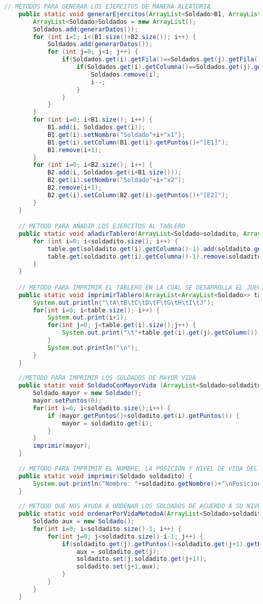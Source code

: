 \documentclass{article}
\begin{document}
\begin{itemize}
\begin{lstlisting}[language=java]
	// METODOS PARA GENERAR LOS EJERCITOS DE MANERA ALEATORIA
	public static void generarEjercitos(ArrayList<Soldado>B1, ArrayList<Soldado>B2) {
		ArrayList<Soldado>Soldados = new ArrayList();
		Soldados.add(generarDatos());
		for (int i=1; i<(B1.size()+B2.size()); i++) {
			Soldados.add(generarDatos());
			for (int j=0; j<i; j++) {
				if(Soldados.get(i).getFila()==Soldados.get(j).getFila()) {
					if(Soldados.get(i).getColumna()==Soldados.get(j).getColumna()){
						Soldados.remove(i);
						i--;
					}
				}
			}
		}
		for (int i=0; i<B1.size(); i++) {
			B1.add(i, Soldados.get(i));
			B1.get(i).setNombre("Soldado"+i+"x1");
			B1.get(i).setColumn(B1.get(i).getPuntos()+"[E1]");
			B1.remove(i+1);
		}
		for (int i=0; i<B2.size(); i++) {
			B2.add(i, Soldados.get(i+B1.size()));
			B2.get(i).setNombre("Soldado"+i+"x2");
			B2.remove(i+1);
			B2.get(i).setColumn(B2.get(i).getPuntos()+"[E2]");
		}
	}

	// METODO PARA AÑADIR LOS EJERCITOS AL TABLERO
	public static void añadirTablero(ArrayList<Soldado>soldadito, ArrayList<ArrayList<Soldado>>table) {
		for (int i=0; i<soldadito.size(); i++) {
			table.get(soldadito.get(i).getColumna()-1).add(soldadito.get(i).getFila()-1,soldadito.get(i));
			table.get(soldadito.get(i).getColumna()-1).remove(soldadito.get(i).getFila());
		}
	}

	// METODO PARA IMPRIMIR EL TABLERO EN LA CUAL SE DESARROLLA EL JUEGO
	public static void imprimirTablero(ArrayList<ArrayList<Soldado>> table) {
		System.out.println("\tA\tB\tC\tD\tF\tG\tH\tI\tJ");
		for(int i=0; i<table.size(); i++) {
			System.out.print(i+1);
			for(int j=0; j<table.get(i).size();j++) {
				System.out.print("\t"+table.get(i).get(j).getColumn());
			}
			System.out.println("\n");
		}
	}
	
	//METODO PARA IMPRIMIR LOS SOLDADOS DE MAYOR VIDA
	public static void SoldadoConMayorVida (ArrayList<Soldado>soldadito) {
		Soldado mayor = new Soldado();
		mayor.setPuntos(0);
		for(int i=0; i<soldadito.size();i++) {
			if (mayor.getPuntos()<soldadito.get(i).getPuntos()) {
				mayor = soldadito.get(i);
			}
		}
		imprimir(mayor);
	}
	
	// METODO PARA IMPRIMIR EL NOMBRE, LA POSICION Y NIVEL DE VIDA DEL SOLDADO
	public static void imprimir(Soldado soldadito) {
		System.out.println("Nombre: "+soldadito.getNombre()+"\nPosicion: "+soldadito.getColumna()+"X"+soldadito.getFila()+"\tVida: "+soldadito.getPuntos());
	}
	
	// METODO QUE NOS AYUDA A ORDENAR LOS SOLDADOS DE ACUERDO A SU NIVEL DE VIDA, USUANDO UN ALGORITMO DE ORDENAMIENTO DE BURBUJA
	public static void ordenarPorVidaMetodoA(ArrayList<Soldado>soldadito) {
		Soldado aux = new Soldado();
		for(int i=0; i<soldadito.size()-1; i++) {
			for(int j=0; j<soldadito.size()-i-1; j++) {
				if(soldadito.get(j).getPuntos()<soldadito.get(j+1).getPuntos()) {
					aux = soldadito.get(j);
					soldadito.set(j,soldadito.get(j+1));
					soldadito.set(j+1,aux);
				}
			}
		}
	}


\end{lstlisting}
\end{itemize}
\end{document}
